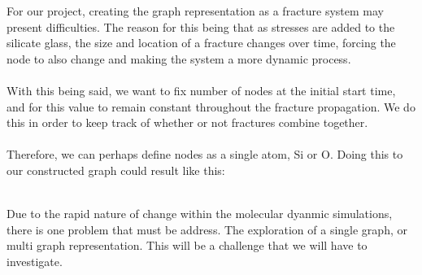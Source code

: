 \begin{itemize}
For our project, creating the graph representation as a fracture system may present difficulties. The reason for this being that as stresses are added to the silicate glass, the size and location of a fracture changes over time, forcing the node to also change and making the system a more dynamic process.
\bigskip
\\
\\
With this being said, we want to fix number of nodes at the initial start time, and for this value to remain constant throughout the fracture propagation. We do this in order to keep track of whether or not fractures combine together.
\bigskip
\\
\\
Therefore, we can perhaps define nodes as a single atom, Si or O. Doing this to our constructed graph could result like this:
\bigskip
\\
\bigskip
\\
Due to the rapid nature of change within the molecular dyanmic simulations, there is one problem that must be address. The exploration of a single graph, or multi graph representation. This will be a challenge that we will have to investigate.   


\end{itemize}
